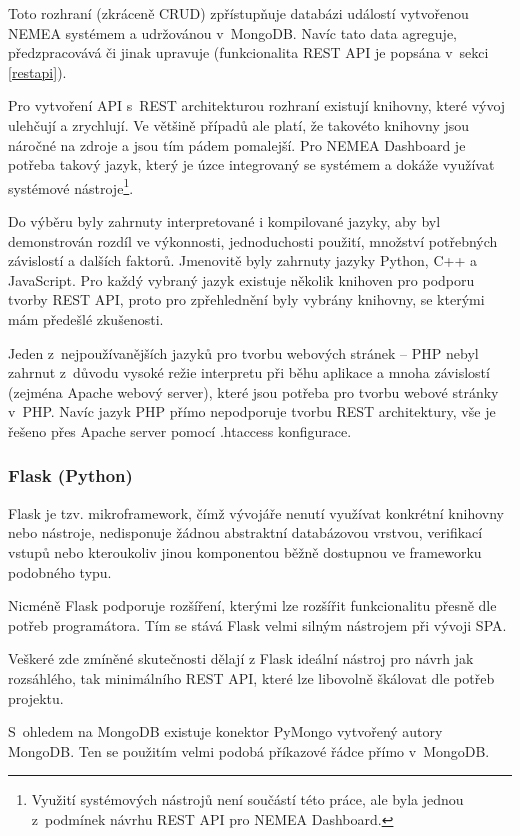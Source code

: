 Toto rozhraní (zkráceně CRUD) zpřístupňuje databázi událostí vytvořenou NEMEA systémem a udržovánou v~MongoDB. Navíc tato data agreguje, předzpracovává či jinak upravuje (funkcionalita REST API je popsána v~sekci \ref{restapi}).

Pro vytvoření API s~REST architekturou rozhraní existují knihovny, které vývoj ulehčují a zrychlují. Ve většině případů ale platí, že takovéto knihovny jsou náročné na zdroje a jsou tím pádem pomalejší. Pro NEMEA Dashboard je potřeba takový jazyk, který je úzce integrovaný se systémem a dokáže využívat systémové nástroje\footnote{Využití systémových nástrojů není součástí této práce, ale byla jednou z~podmínek návrhu REST API pro NEMEA Dashboard.}.

Do výběru byly zahrnuty interpretované i kompilované jazyky, aby byl demonstrován rozdíl ve výkonnosti, jednoduchosti použití, množství potřebných závislostí a dalších faktorů. Jmenovitě byly zahrnuty jazyky Python, C++ a JavaScript. Pro každý vybraný jazyk existuje několik knihoven pro podporu tvorby REST API, proto pro zpřehlednění byly vybrány knihovny, se kterými mám předešlé zkušenosti.

Jeden z~nejpoužívanějších jazyků pro tvorbu webových stránek -- PHP nebyl zahrnut z~důvodu vysoké režie interpretu při běhu aplikace a mnoha závislostí (zejména Apache webový server), které jsou potřeba pro tvorbu webové stránky v~PHP. Navíc jazyk PHP přímo nepodporuje tvorbu REST architektury, vše je řešeno přes Apache server pomocí .htaccess konfigurace.

\subsubsection*{Flask (Python)}

Flask je tzv. mikroframework, čímž vývojáře nenutí využívat konkrétní knihovny nebo nástroje, nedisponuje žádnou abstraktní databázovou vrstvou, verifikací vstupů nebo kteroukoliv jinou komponentou běžně dostupnou ve frameworku podobného typu.

Nicméně Flask podporuje rozšíření, kterými lze rozšířit funkcionalitu přesně dle potřeb programátora. Tím se stává Flask velmi silným nástrojem při vývoji SPA.

Veškeré zde zmíněné skutečnosti dělají z Flask ideální nástroj pro návrh jak rozsáhlého, tak minimálního REST API, které lze libovolně škálovat dle potřeb projektu.

S~ohledem na MongoDB existuje konektor PyMongo vytvořený autory MongoDB. Ten se použitím velmi podobá příkazové řádce přímo v~MongoDB. 

